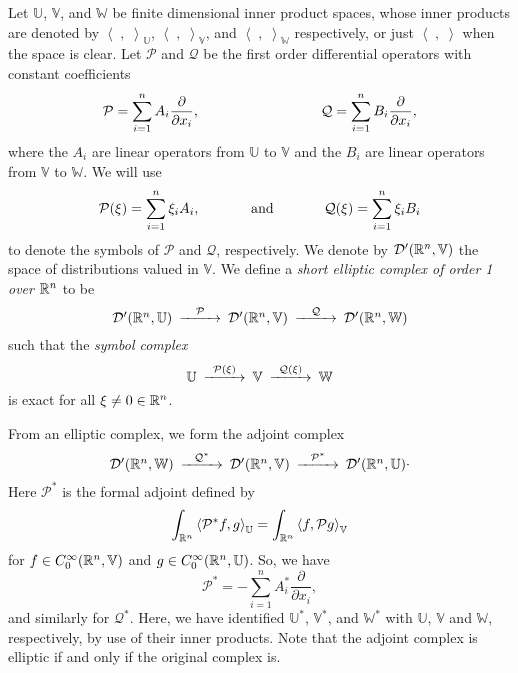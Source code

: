 \documentclass{amsart}
\theoremstyle{definition}
\numberwithin{equation}{section}
\begin{document}
Let ${\mathbb{U}}$, ${\mathbb{V}}$, and ${\mathbb{W}}$ be finite dimensional inner product spaces, whose inner products are denoted by $\left<\; , \;\right>_{\mathbb{U}}$, $\left< \; , \; \right>_{\mathbb{V}}$, and $\left< \; , \; \right>_{\mathbb{W}}$ respectively, or just $\left< \; , \; \right>$ when the space is clear. Let ${\mathcal{P}}$ and ${\mathcal{Q}}$ be the first order differential operators with constant coefficients $${\mathcal{P}}= \sum_{i=1}^n A_i \frac{\partial}{\partial x_i}, \hspace{1.2in} {\mathcal{Q}}= \sum_{i=1}^n B_i \frac{\partial}{\partial x_i},$$ where the $A_i$ are linear operators from ${\mathbb{U}}$ to ${\mathbb{V}}$ and the $B_i$ are linear operators from ${\mathbb{V}}$ to ${\mathbb{W}}$.  We will use $${\mathcal{P}}(\xi) = \sum_{i=1}^n \xi_i A_i, \hspace{.5in} \textrm{and} \hspace{.5in} {\mathcal{Q}}(\xi)=\sum_{i=1}^n \xi_i B_i$$ to denote the symbols of ${\mathcal{P}}$ and ${\mathcal{Q}}$, respectively.  We denote by ${\mathcal{D}}'(\Bbb R^n, {\mathbb{V}})$ the space of distributions valued in ${\mathbb{V}}$.  We define a \textit{short elliptic complex of order 1 over $\Bbb R^n$} to be $$\begin{CD} {\mathcal{D}}'(\Bbb R^n, {\mathbb{U}}) @>{\mathcal{P}}>> {\mathcal{D}}'(\Bbb R^n, {\mathbb{V}}) @>{\mathcal{Q}}>> {\mathcal{D}}'(\Bbb R^n, {\mathbb{W}}) \end{CD}$$ such that the \textit{symbol complex} $$\begin{CD} {\mathbb{U}} @>{\mathcal{P}}(\xi)>> {\mathbb{V}} @>{\mathcal{Q}}(\xi)>> {\mathbb{W}} \end{CD}$$ is exact for all $\xi \neq 0 \in \Bbb R^n$.

From an elliptic complex, we form the adjoint complex $$\begin{CD} {\mathcal{D}}'(\Bbb R^n, {\mathbb{W}}) @>{\mathcal{Q}}^*>> {\mathcal{D}}'(\Bbb R^n, {\mathbb{V}}) @>{\mathcal{P}}^*>> {\mathcal{D}}'(\Bbb R^n, {\mathbb{U}})\end{CD}.$$ Here ${\mathcal{P}}^*$ is the formal adjoint defined by $$\int_{\Bbb R^n} \left<{\mathcal{P}}^*f,g\right>_{\mathbb{U}} = \int_{\Bbb R^n} \left<f, {\mathcal{P}} g\right>_{\mathbb{V}}$$ for $f \in C^\infty_0(\Bbb R^n, {\mathbb{V}})$ and $g \in C^\infty_0(\Bbb R^n, {\mathbb{U}})$.  So, we have \begin{equation}\label{adj_def}{\mathcal{P}}^* = - \sum_{i=1}^n A^*_i \frac{\partial}{\partial x_i},\end{equation} and similarly for ${\mathcal{Q}}^*$.  Here, we have identified ${\mathbb{U}}^*$, ${\mathbb{V}}^*$, and ${\mathbb{W}}^*$ with ${\mathbb{U}}$, ${\mathbb{V}}$ and ${\mathbb{W}}$, respectively, by use of their inner products.  Note that the adjoint complex is elliptic if and only if the original complex is.
\end{document}
